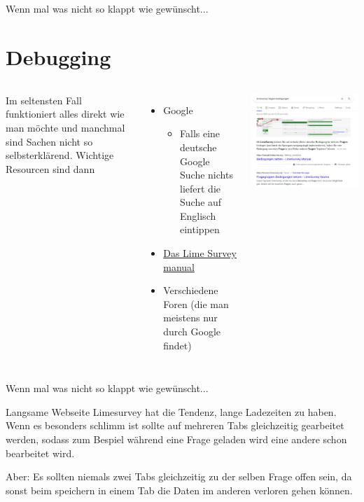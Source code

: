 \documentclass[aspectratio=1610, 9pt]{beamer}
\begin{document}
\begin{frame}{Wenn mal was nicht so klappt wie gewünscht...}
	\section{Debugging}
	\label{sec:Debugging}
	\begin{columns}
		Im seltensten Fall funktioniert alles direkt wie man möchte und manchmal sind
		Sachen nicht so selbsterklärend. Wichtige Resourcen sind dann
		\begin{itemize}
			\item Google
				\begin{itemize}
					\item Falls eine deutsche Google Suche nichts
						liefert die Suche auf Englisch eintippen
				\end{itemize}
			\item \href{https://manual.limesurvey.org}{Das Lime Survey manual}
			\item Verschiedene Foren (die man meistens nur durch Google
				findet)
		\end{itemize}
		\includegraphics[width=\linewidth]{images/google-search.png}
	\end{columns}
\end{frame}

\begin{frame}{Wenn mal was nicht so klappt wie gewünscht...}
	\begin{block}
		{Langsame Webseite}
		Limesurvey hat die Tendenz, lange Ladezeiten zu haben. Wenn es besonders
		schlimm ist sollte auf mehreren Tabs gleichzeitig gearbeitet werden,
		sodass zum Bespiel während eine Frage geladen wird eine andere schon
		bearbeitet wird.
	\end{block}
	\begin{alertblock}{Aber:}
		Es sollten \alert{niemals} zwei Tabs gleichzeitig zu der selben Frage
		offen sein, da sonst beim speichern in einem Tab die Daten im anderen
		verloren gehen können.
	\end{alertblock}
\end{frame}
\end{document}
